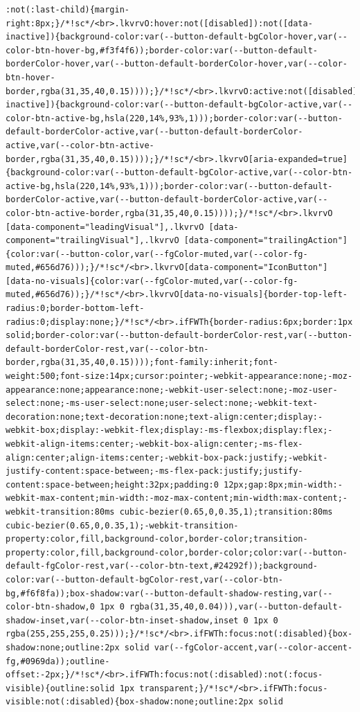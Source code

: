 \documentclass[
  letterpaper,
]{book}
\begin{document}
\begin{verbatim}
:not(:last-child){margin-right:8px;}/*!sc*/<br>.lkvrvO:hover:not([disabled]):not([data-inactive]){background-color:var(--button-default-bgColor-hover,var(--color-btn-hover-bg,#f3f4f6));border-color:var(--button-default-borderColor-hover,var(--button-default-borderColor-hover,var(--color-btn-hover-border,rgba(31,35,40,0.15))));}/*!sc*/<br>.lkvrvO:active:not([disabled]):not([data-inactive]){background-color:var(--button-default-bgColor-active,var(--color-btn-active-bg,hsla(220,14%,93%,1)));border-color:var(--button-default-borderColor-active,var(--button-default-borderColor-active,var(--color-btn-active-border,rgba(31,35,40,0.15))));}/*!sc*/<br>.lkvrvO[aria-expanded=true]{background-color:var(--button-default-bgColor-active,var(--color-btn-active-bg,hsla(220,14%,93%,1)));border-color:var(--button-default-borderColor-active,var(--button-default-borderColor-active,var(--color-btn-active-border,rgba(31,35,40,0.15))));}/*!sc*/<br>.lkvrvO [data-component="leadingVisual"],.lkvrvO [data-component="trailingVisual"],.lkvrvO [data-component="trailingAction"]{color:var(--button-color,var(--fgColor-muted,var(--color-fg-muted,#656d76)));}/*!sc*/<br>.lkvrvO[data-component="IconButton"][data-no-visuals]{color:var(--fgColor-muted,var(--color-fg-muted,#656d76));}/*!sc*/<br>.lkvrvO[data-no-visuals]{border-top-left-radius:0;border-bottom-left-radius:0;display:none;}/*!sc*/<br>.ifFWTh{border-radius:6px;border:1px solid;border-color:var(--button-default-borderColor-rest,var(--button-default-borderColor-rest,var(--color-btn-border,rgba(31,35,40,0.15))));font-family:inherit;font-weight:500;font-size:14px;cursor:pointer;-webkit-appearance:none;-moz-appearance:none;appearance:none;-webkit-user-select:none;-moz-user-select:none;-ms-user-select:none;user-select:none;-webkit-text-decoration:none;text-decoration:none;text-align:center;display:-webkit-box;display:-webkit-flex;display:-ms-flexbox;display:flex;-webkit-align-items:center;-webkit-box-align:center;-ms-flex-align:center;align-items:center;-webkit-box-pack:justify;-webkit-justify-content:space-between;-ms-flex-pack:justify;justify-content:space-between;height:32px;padding:0 12px;gap:8px;min-width:-webkit-max-content;min-width:-moz-max-content;min-width:max-content;-webkit-transition:80ms cubic-bezier(0.65,0,0.35,1);transition:80ms cubic-bezier(0.65,0,0.35,1);-webkit-transition-property:color,fill,background-color,border-color;transition-property:color,fill,background-color,border-color;color:var(--button-default-fgColor-rest,var(--color-btn-text,#24292f));background-color:var(--button-default-bgColor-rest,var(--color-btn-bg,#f6f8fa));box-shadow:var(--button-default-shadow-resting,var(--color-btn-shadow,0 1px 0 rgba(31,35,40,0.04))),var(--button-default-shadow-inset,var(--color-btn-inset-shadow,inset 0 1px 0 rgba(255,255,255,0.25)));}/*!sc*/<br>.ifFWTh:focus:not(:disabled){box-shadow:none;outline:2px solid var(--fgColor-accent,var(--color-accent-fg,#0969da));outline-offset:-2px;}/*!sc*/<br>.ifFWTh:focus:not(:disabled):not(:focus-visible){outline:solid 1px transparent;}/*!sc*/<br>.ifFWTh:focus-visible:not(:disabled){box-shadow:none;outline:2px solid 
\end{verbatim}
\end{document}
